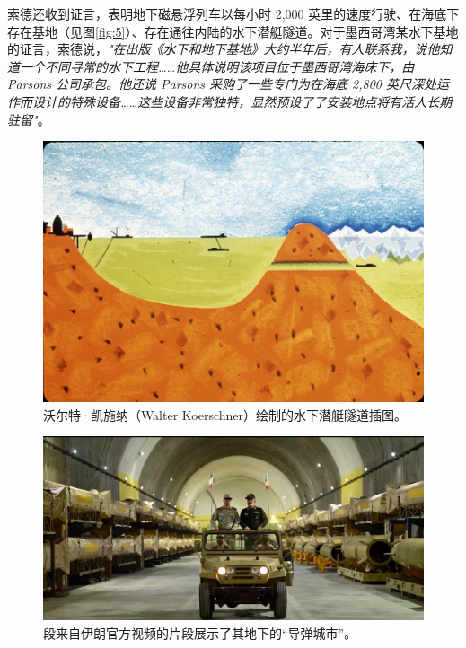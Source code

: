 \documentclass[10pt,twocolumn,letterpaper]{article}
\begin{document}
索德还收到证言，表明地下磁悬浮列车以每小时 2,000 英里的速度行驶、在海底下存在基地（见图\ref{fig:5}）、存在通往内陆的水下潜艇隧道。对于墨西哥湾某水下基地的证言，索德说，\textit{"在出版《水下和地下基地》大约半年后，有人联系我，说他知道一个不同寻常的水下工程……他具体说明该项目位于墨西哥湾海床下，由 Parsons 公司承包。他还说 Parsons 采购了一些专门为在海底 2,800 英尺深处运作而设计的特殊设备……这些设备非常独特，显然预设了了安装地点将有活人长期驻留"}\cite{22}。

\begin{figure}[t]
\begin{center}
   \includegraphics[width=1\linewidth]{sub.jpg}
\end{center}
   \caption{沃尔特·凯施纳（Walter Koerschner）绘制的水下潜艇隧道插图\cite{22,23}。}
\label{fig:6}
\label{fig:onecol}
\end{figure}

\begin{figure}[t]
\begin{center}
   \includegraphics[width=1\linewidth]{iran.jpeg}
\end{center}
   \caption{段来自伊朗官方视频的片段展示了其地下的“导弹城市”\cite{39,40}。}
\label{fig:12}
\label{fig:onecol}
\end{figure}
\end{document}
